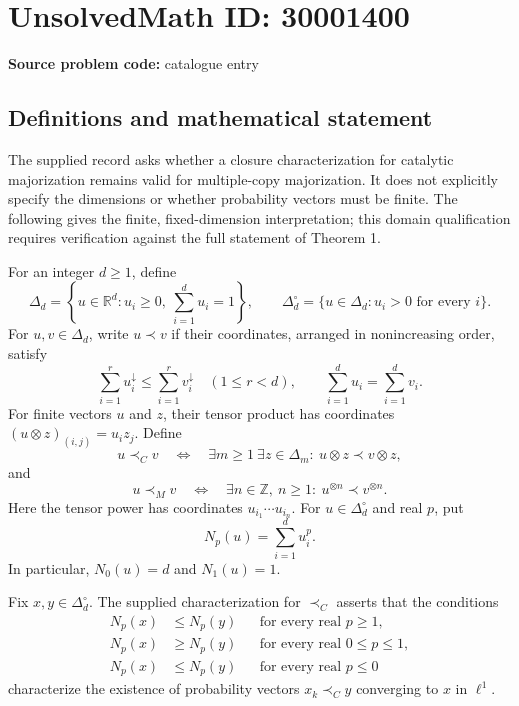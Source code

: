 \documentclass[11pt]{article}
\newcommand{\Z}{\mathbb{Z}}
\newcommand{\R}{\mathbb{R}}
\begin{document}
\section*{UnsolvedMath ID: 30001400}
\textbf{Source problem code:} catalogue entry
\subsection{Definitions and mathematical statement}
The supplied record asks whether a closure characterization for catalytic majorization remains valid for multiple-copy majorization. It does not explicitly specify the dimensions or whether probability vectors must be finite. The following gives the finite, fixed-dimension interpretation; this domain qualification requires verification against the full statement of Theorem 1.

For an integer \(d\geq1\), define
\[
\Delta_d=\left\{u\in\R^d:u_i\geq0,\ \sum_{i=1}^d u_i=1\right\},\qquad
\Delta_d^{\circ}=\{u\in\Delta_d:u_i>0\text{ for every }i\}.
\]
For \(u,v\in\Delta_d\), write \(u\prec v\) if their coordinates, arranged in nonincreasing order, satisfy
\[
\sum_{i=1}^r u_i^{\downarrow}\leq\sum_{i=1}^r v_i^{\downarrow}
\quad(1\leq r<d),\qquad
\sum_{i=1}^d u_i=\sum_{i=1}^d v_i.
\]
For finite vectors \(u\) and \(z\), their tensor product has coordinates \((u\otimes z)_{(i,j)}=u_i z_j\). Define
\[
u\prec_C v
\quad\Longleftrightarrow\quad
\exists m\geq1\ \exists z\in\Delta_m:\ u\otimes z\prec v\otimes z,
\]
and
\[
u\prec_M v
\quad\Longleftrightarrow\quad
\exists n\in\Z,\ n\geq1:\ u^{\otimes n}\prec v^{\otimes n}.
\]
Here the tensor power has coordinates \(u_{i_1}\cdots u_{i_n}\). For \(u\in\Delta_d^{\circ}\) and real \(p\), put
\[
N_p(u)=\sum_{i=1}^d u_i^p.
\]
In particular, \(N_0(u)=d\) and \(N_1(u)=1\).

Fix \(x,y\in\Delta_d^{\circ}\). The supplied characterization for \(\prec_C\) asserts that the conditions
\[
\begin{aligned}
N_p(x)&\leq N_p(y)&&\text{for every real }p\geq1,\\
N_p(x)&\geq N_p(y)&&\text{for every real }0\leq p\leq1,\\
N_p(x)&\leq N_p(y)&&\text{for every real }p\leq0
\end{aligned}
\tag{P}
\]
characterize the existence of probability vectors \(x_k\prec_C y\) converging to \(x\) in \(\ell^1\).
\end{document}
